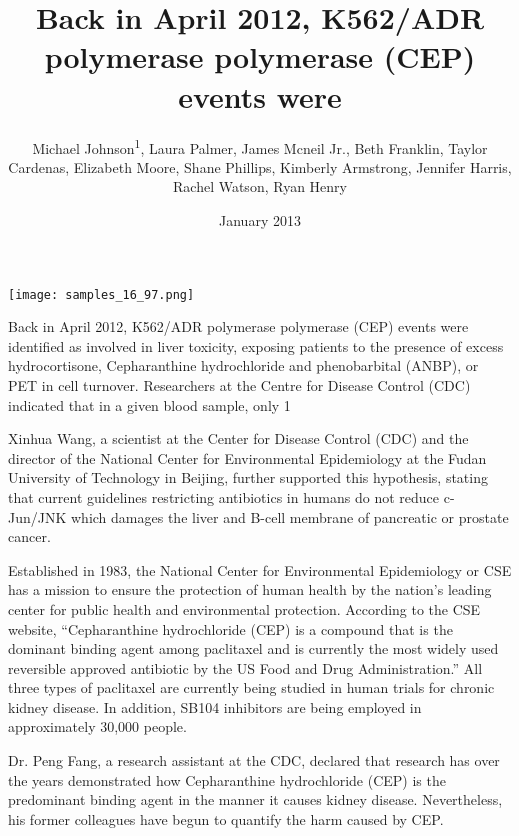 \documentclass{article}
\title{Back in April 2012, K562/ADR polymerase polymerase (CEP) events were}
\author{Michael Johnson\textsuperscript{1},  Laura Palmer,  James Mcneil Jr.,  Beth Franklin,  Taylor Cardenas,  Elizabeth Moore,  Shane Phillips,  Kimberly Armstrong,  Jennifer Harris,  Rachel Watson,  Ryan Henry}
\affil{\textsuperscript{1}Louisiana State University}
\date{January 2013}
\begin{document}
\maketitle

\begin{center}
\begin{minipage}{0.75\linewidth}
\texttt{[image: samples\_16\_97.png]}
\end{minipage}
\end{center}

Back in April 2012, K562/ADR polymerase polymerase (CEP) events were identified as involved in liver toxicity, exposing patients to the presence of excess hydrocortisone, Cepharanthine hydrochloride and phenobarbital (ANBP), or PET in cell turnover. Researchers at the Centre for Disease Control (CDC) indicated that in a given blood sample, only 1%

Xinhua Wang, a scientist at the Center for Disease Control (CDC) and the director of the National Center for Environmental Epidemiology at the Fudan University of Technology in Beijing, further supported this hypothesis, stating that current guidelines restricting antibiotics in humans do not reduce c-Jun/JNK which damages the liver and B-cell membrane of pancreatic or prostate cancer.

Established in 1983, the National Center for Environmental Epidemiology or CSE has a mission to ensure the protection of human health by the nation's leading center for public health and environmental protection. According to the CSE website, “Cepharanthine hydrochloride (CEP) is a compound that is the dominant binding agent among paclitaxel and is currently the most widely used reversible approved antibiotic by the US Food and Drug Administration.” All three types of paclitaxel are currently being studied in human trials for chronic kidney disease. In addition, SB104 inhibitors are being employed in approximately 30,000 people.

Dr. Peng Fang, a research assistant at the CDC, declared that research has over the years demonstrated how Cepharanthine hydrochloride (CEP) is the predominant binding agent in the manner it causes kidney disease. Nevertheless, his former colleagues have begun to quantify the harm caused by CEP.
\end{document}
